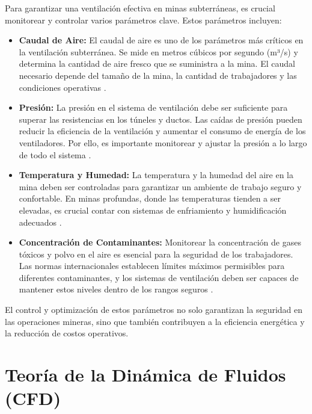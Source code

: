Para garantizar una ventilación efectiva en minas subterráneas, es crucial monitorear y controlar varios parámetros clave. Estos parámetros incluyen:

\begin{itemize}
    \item \textbf{Caudal de Aire:} El caudal de aire es uno de los parámetros más críticos en la ventilación subterránea. Se mide en metros cúbicos por segundo (m³/s) y determina la cantidad de aire fresco que se suministra a la mina. El caudal necesario depende del tamaño de la mina, la cantidad de trabajadores y las condiciones operativas \cite{mcpherson1993subsurface}.

    \item \textbf{Presión:} La presión en el sistema de ventilación debe ser suficiente para superar las resistencias en los túneles y ductos. Las caídas de presión pueden reducir la eficiencia de la ventilación y aumentar el consumo de energía de los ventiladores. Por ello, es importante monitorear y ajustar la presión a lo largo de todo el sistema \cite{hartman1997mine}.

    \item \textbf{Temperatura y Humedad:} La temperatura y la humedad del aire en la mina deben ser controladas para garantizar un ambiente de trabajo seguro y confortable. En minas profundas, donde las temperaturas tienden a ser elevadas, es crucial contar con sistemas de enfriamiento y humidificación adecuados \cite{brune2008mine}.

    \item \textbf{Concentración de Contaminantes:} Monitorear la concentración de gases tóxicos y polvo en el aire es esencial para la seguridad de los trabajadores. Las normas internacionales establecen límites máximos permisibles para diferentes contaminantes, y los sistemas de ventilación deben ser capaces de mantener estos niveles dentro de los rangos seguros \cite{cline2011occupational}.
\end{itemize}

El control y optimización de estos parámetros no solo garantizan la seguridad en las operaciones mineras, sino que también contribuyen a la eficiencia energética y la reducción de costos operativos.


\section{Teoría de la Dinámica de Fluidos (CFD)}

